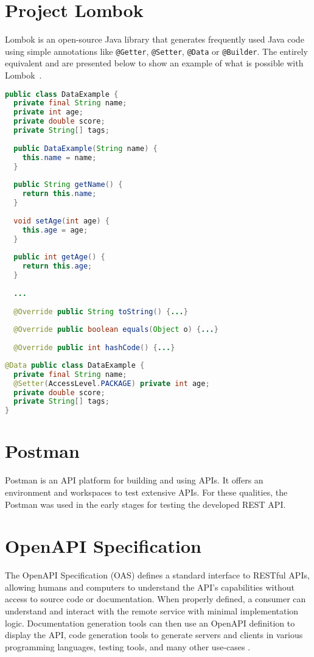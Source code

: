 \section{Project Lombok} \label{sec:lombok}
Lombok is an open-source Java library that generates frequently used Java code using simple annotations like \texttt{@Getter}, \texttt{@Setter}, \texttt{@Data} or \texttt{@Builder}.
The entirely equivalent  and  are presented below to show an example of what is possible with Lombok~\cite{lombok}.
\begin{lstlisting}[language=Java, caption=Vanilla Java, label=lst:vanilla]
public class DataExample {
  private final String name;
  private int age;
  private double score;
  private String[] tags;
  
  public DataExample(String name) {
    this.name = name;
  }
  
  public String getName() {
    return this.name;
  }
  
  void setAge(int age) {
    this.age = age;
  }
  
  public int getAge() {
    return this.age;
  }
  
  ...
  
  @Override public String toString() {...}
  
  @Override public boolean equals(Object o) {...}
  
  @Override public int hashCode() {...}
\end{lstlisting}
\begin{lstlisting}[language=Java, caption=Java with Lombok, label=lst:lombok]
@Data public class DataExample {
  private final String name;
  @Setter(AccessLevel.PACKAGE) private int age;
  private double score;
  private String[] tags;
}
\end{lstlisting}


\section{Postman} \label{sec:postman}
Postman is an API platform for building and using APIs. It offers an environment and workspaces to test extensive APIs.
For these qualities, the Postman was used in the early stages for testing the developed REST API.


\section{OpenAPI Specification} \label{sec:openapi}
The OpenAPI Specification (OAS) defines a standard interface to RESTful APIs, allowing humans and computers to understand the API’s capabilities without access to source code or documentation. When properly defined, a consumer can understand and interact with the remote service with minimal implementation logic.
Documentation generation tools can then use an OpenAPI definition to display the API, code generation tools to generate servers and clients in various programming languages, testing tools, and many other use-cases \cite{openapi}.

